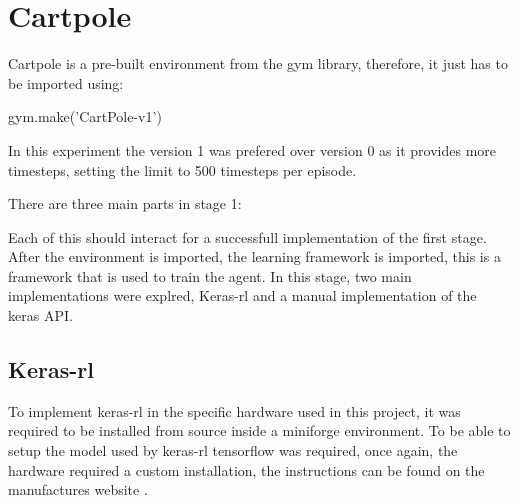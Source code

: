 
\section{Cartpole}
Cartpole is a pre-built environment from the gym library, therefore, it just has to be imported using:
\begin{center}
    gym.make('CartPole-v1')
\end{center}

In this experiment the version 1 was prefered over version 0 as it provides more timesteps, setting the limit to 500 timesteps per episode.

There are three main parts in stage 1:
\begin{figure}[H]
    \centering
\end{figure}

Each of this should interact for a successfull implementation of the first stage.
After the environment is imported, the learning framework is imported, this is a framework that is used to train the agent.
In this stage, two main implementations were explred, Keras-rl and a manual implementation of the keras API.

    \subsection*{Keras-rl}
    To implement keras-rl\cite{kerasrl2} in the specific hardware used in this project, it was required to be installed from source inside a miniforge environment.
    To be able to setup the model used by keras-rl tensorflow was required, once again, the hardware required a custom installation, the instructions can be found on the manufactures website \cite{apple-tf}.

